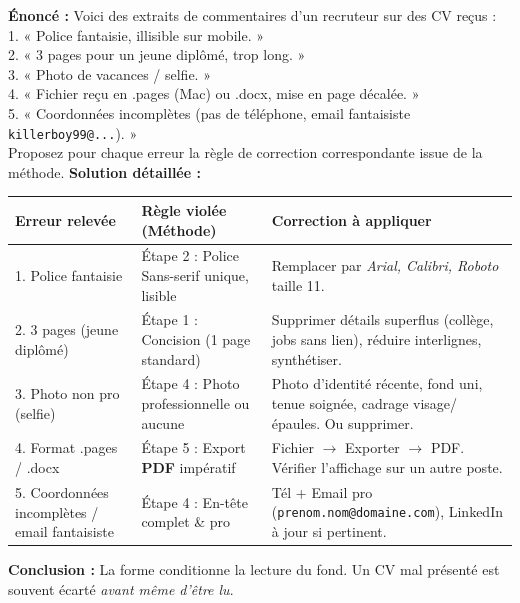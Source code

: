 \documentclass[11pt]{article}
\newcounter{popsec}
\newcounter{popsub}
\newcommand{\courssub}[1]{%
  \stepcounter{popsub}%
  \par\vspace{9pt}\noindent{\popxbold\fontsize{11.5}{13}\selectfont\color{popink}{\color{poporange}\thepopsec.\thepopsub}\hspace{6pt}#1}\par\nopagebreak\vspace{4pt}
}
\begin{document}
\begin{exoresolu}
\textbf{Énoncé :} Voici des extraits de commentaires d'un recruteur sur des CV reçus : \\
1. « Police fantaisie, illisible sur mobile. » \\
2. « 3 pages pour un jeune diplômé, trop long. » \\
3. « Photo de vacances / selfie. » \\
4. « Fichier reçu en .pages (Mac) ou .docx, mise en page décalée. » \\
5. « Coordonnées incomplètes (pas de téléphone, email fantaisiste \texttt{killerboy99@...}). » \\
Proposez pour chaque erreur la règle de correction correspondante issue de la méthode.
\tcblower
\textbf{Solution détaillée :}

\begin{center}
\begin{tabularx}{\linewidth}{|l|X|X|}\hline
\textbf{Erreur relevée} & \textbf{Règle violée (Méthode)} & \textbf{Correction à appliquer} \\ \hline
1. Police fantaisie & Étape 2 : Police Sans-serif unique, lisible & Remplacer par \emph{Arial, Calibri, Roboto} taille 11. \\ \hline
2. 3 pages (jeune diplômé) & Étape 1 : Concision (1 page standard) & Supprimer détails superflus (collège, jobs sans lien), réduire interlignes, synthétiser. \\ \hline
3. Photo non pro (selfie) & Étape 4 : Photo professionnelle ou aucune & Photo d'identité récente, fond uni, tenue soignée, cadrage visage/épaules. Ou supprimer. \\ \hline
4. Format .pages / .docx & Étape 5 : Export \textbf{PDF} impératif & Fichier $\to$ Exporter $\to$ PDF. Vérifier l'affichage sur un autre poste. \\ \hline
5. Coordonnées incomplètes / email fantaisiste & Étape 4 : En-tête complet \& pro & Tél + Email pro (\texttt{prenom.nom@domaine.com}), LinkedIn à jour si pertinent. \\ \hline
\end{tabularx}
\end{center}

\textbf{Conclusion :} La forme conditionne la lecture du fond. Un CV mal présenté est souvent écarté \emph{avant même d'être lu}.
\end{exoresolu}

\courssub{La structure interne du CV}
\end{document}
